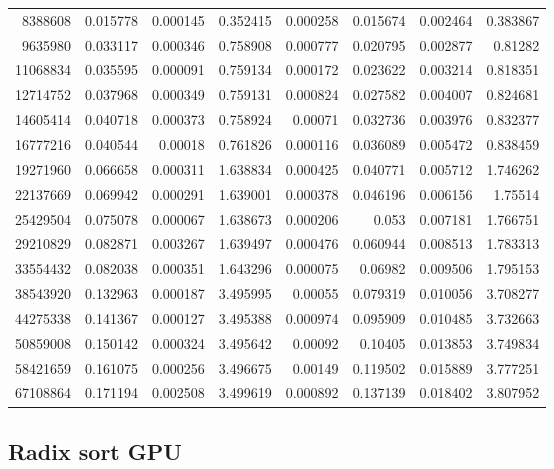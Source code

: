 \begin{longtable}{r r r r r r r r}
8388608 & 0.015778 & 0.000145 & 0.352415 & 0.000258 & 0.015674 & 0.002464 & 0.383867 \\
9635980 & 0.033117 & 0.000346 & 0.758908 & 0.000777 & 0.020795 & 0.002877 & 0.81282 \\
11068834 & 0.035595 & 0.000091 & 0.759134 & 0.000172 & 0.023622 & 0.003214 & 0.818351 \\
12714752 & 0.037968 & 0.000349 & 0.759131 & 0.000824 & 0.027582 & 0.004007 & 0.824681 \\
14605414 & 0.040718 & 0.000373 & 0.758924 & 0.00071 & 0.032736 & 0.003976 & 0.832377 \\
16777216 & 0.040544 & 0.00018 & 0.761826 & 0.000116 & 0.036089 & 0.005472 & 0.838459 \\
19271960 & 0.066658 & 0.000311 & 1.638834 & 0.000425 & 0.040771 & 0.005712 & 1.746262 \\
22137669 & 0.069942 & 0.000291 & 1.639001 & 0.000378 & 0.046196 & 0.006156 & 1.75514 \\
25429504 & 0.075078 & 0.000067 & 1.638673 & 0.000206 & 0.053 & 0.007181 & 1.766751 \\
29210829 & 0.082871 & 0.003267 & 1.639497 & 0.000476 & 0.060944 & 0.008513 & 1.783313 \\
33554432 & 0.082038 & 0.000351 & 1.643296 & 0.000075 & 0.06982 & 0.009506 & 1.795153 \\
38543920 & 0.132963 & 0.000187 & 3.495995 & 0.00055 & 0.079319 & 0.010056 & 3.708277 \\
44275338 & 0.141367 & 0.000127 & 3.495388 & 0.000974 & 0.095909 & 0.010485 & 3.732663 \\
50859008 & 0.150142 & 0.000324 & 3.495642 & 0.00092 & 0.10405 & 0.013853 & 3.749834 \\
58421659 & 0.161075 & 0.000256 & 3.496675 & 0.00149 & 0.119502 & 0.015889 & 3.777251 \\
67108864 & 0.171194 & 0.002508 & 3.499619 & 0.000892 & 0.137139 & 0.018402 & 3.807952 \\
\end{longtable}

\subsection*{Radix sort GPU}


